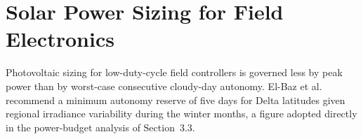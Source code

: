 \section{Solar Power Sizing for Field Electronics}
Photovoltaic sizing for low-duty-cycle field controllers is governed less by peak power than
by worst-case consecutive cloudy-day autonomy. El-Baz et al.\ \cite{elbaz2023} recommend a minimum
autonomy reserve of five days for Delta latitudes given regional irradiance variability
during the winter months, a figure adopted directly in the power-budget analysis of
Section~3.3.
